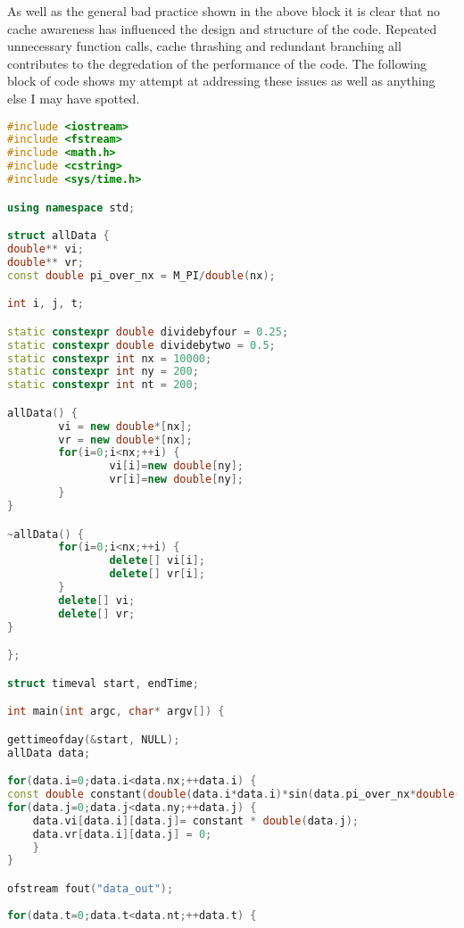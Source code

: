 \documentclass[10pt]{report}
\begin{document}
\vspace{1cm}
As well as the general bad practice shown in the above block it is clear that no cache awareness has influenced the design and structure of the code. Repeated unnecessary function calls, cache thrashing and redundant branching all contributes to the degredation of the performance of the code. The following block of code shows my attempt at addressing these issues as well as anything else I may have spotted.



\newpage
\begin{lstlisting}[language=C++, caption=Optimized code listing]
#include <iostream>
#include <fstream>
#include <math.h>
#include <cstring>
#include <sys/time.h>

using namespace std;

struct allData { 
double** vi;
double** vr;
const double pi_over_nx = M_PI/double(nx);

int i, j, t;

static constexpr double dividebyfour = 0.25;
static constexpr double dividebytwo = 0.5;
static constexpr int nx = 10000;
static constexpr int ny = 200;
static constexpr int nt = 200;

allData() {
        vi = new double*[nx];
        vr = new double*[nx];
        for(i=0;i<nx;++i) {
                vi[i]=new double[ny];                                    
                vr[i]=new double[ny];
        }
}

~allData() {
        for(i=0;i<nx;++i) {
                delete[] vi[i];
                delete[] vr[i];
        }
        delete[] vi;
        delete[] vr;
}

};

struct timeval start, endTime;

int main(int argc, char* argv[]) {

gettimeofday(&start, NULL);
allData data;

for(data.i=0;data.i<data.nx;++data.i) {
const double constant(double(data.i*data.i)*sin(data.pi_over_nx*double(data.i)));
for(data.j=0;data.j<data.ny;++data.j) {
    data.vi[data.i][data.j]= constant * double(data.j);         
    data.vr[data.i][data.j] = 0;
    }
}

ofstream fout("data_out");
                
for(data.t=0;data.t<data.nt;++data.t) {                                               
                                                                                

\end{lstlisting}
\end{document}
